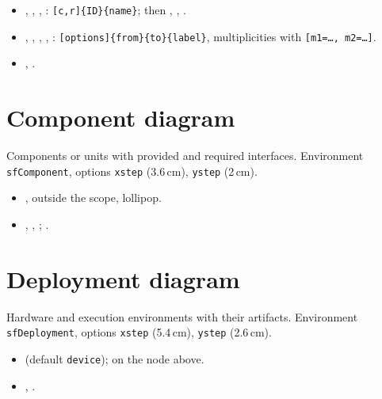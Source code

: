 \begin{itemize}
  \item {}, , , : \texttt{[c,r]\{ID\}\{name\}}; then , , .
  \item {}, , , , : \texttt{[options]\{from\}\{to\}\{label\}}, multiplicities with \texttt{[m1=…, m2=…]}.
  \item {}, .
\end{itemize}


\section{Component diagram}

Components or units with provided and required interfaces. Environment \texttt{sfComponent}, options \texttt{xstep} (3.6\,cm), \texttt{ystep} (2\,cm).

\begin{itemize}
  \item {},  outside the scope,  lollipop.
  \item {}, , ; .
\end{itemize}


\section{Deployment diagram}

Hardware and execution environments with their artifacts. Environment \texttt{sfDeployment}, options \texttt{xstep} (5.4\,cm), \texttt{ystep} (2.6\,cm).

\begin{itemize}
  \item {} (default \texttt{device});  on the node above.
  \item {}, .
\end{itemize}

